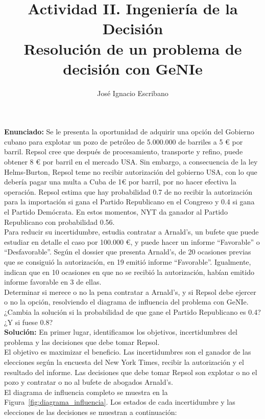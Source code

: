 \documentclass[12pt,a4paper,openright,final]{article}
\author{José Ignacio Escribano}
\title{Actividad II. Ingeniería de la Decisión \\ \textbf{Resolución de un problema de decisión con GeNIe}}
\begin{document}
\maketitle

\textbf{Enunciado:} Se le presenta la oportunidad de adquirir una opción del Gobierno cubano para explotar un pozo de petróleo de 5.000.000 de barriles a 5 € por barril. Repsol cree que después de procesamiento, transporte y refino, puede obtener 8 € por barril en el mercado USA. Sin embargo, a consecuencia de la ley Helms-Burton, Repsol teme no recibir autorización del gobierno USA, con lo que debería pagar una multa a Cuba de 1€ por barril, por no hacer efectiva la operación. Repsol estima que hay probabilidad 0.7 de no recibir la autorización para la importación si gana el Partido Republicano en el Congreso  y 0.4 si gana el Partido Demócrata. En estos momentos, NYT da ganador al Partido Republicano con probabilidad 0.56.\\

Para reducir su incertidumbre, estudia contratar a Arnald’s, un bufete que puede estudiar en detalle el caso por 100.000 €, y puede hacer un informe ``Favorable'' o ``Desfavorable''. Según el dossier que presenta Arnald’s, de 20 ocasiones previas que se consiguió la autorización, en 19 emitió informe ``Favorable''. Igualmente, indican que en 10 ocasiones en que no se recibió la autorización, habían emitido informe favorable en 3 de ellas.\\
 
Determinar si merece o no la pena contratar a Arnald’s, y si Repsol debe ejercer o no la opción, resolviendo el  diagrama de influencia del problema con GeNIe.\\

¿Cambia la solución si la probabilidad de que gane el Partido Republicano  es 0.4? ¿Y si fuese 0.8?\\

\textbf{Solución:} En primer lugar, identificamos los objetivos, incertidumbres del problema y las decisiones que debe tomar Repsol.\\

El objetivo es maximizar el beneficio. Las incertidumbres son el ganador de las elecciones según la encuesta del New York Times, recibir la autorización y el resultado del informe. Las decisiones que debe tomar Repsol son explotar o no el pozo y contratar o no al bufete de abogados Arnald's.\\

El diagrama de influencia completo se muestra en la Figura~\ref{fig:diagrama_influencia}. Los estados de cada incertidumbre y las elecciones de las decisiones se muestran a continuación:
\end{document}
